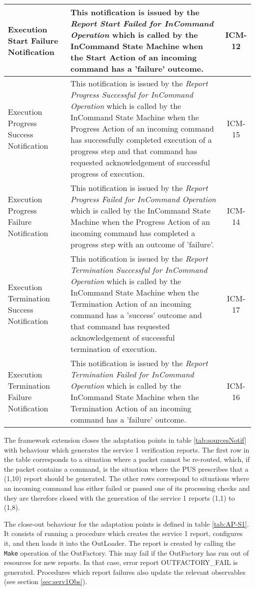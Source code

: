 \documentclass{pnp_article}
\begin{document}
\begin{longtable}{|>{\raggedright\arraybackslash}p{2.1cm}|>{\raggedright\arraybackslash}p{9.8cm}|c|}
\hline 
Execution Start Failure Notification &  This notification is issued by the \textit{Report Start Failed for InCommand Operation} which is called by the InCommand State Machine when the Start Action of an incoming command has a 'failure' outcome. & ICM-12 \\
\hline
Execution Progress Success Notification &  This notification is issued by the \textit{Report Progress Successful for InCommand Operation} which is called by the InCommand State Machine when the Progress Action of an incoming command has successfully completed execution of a progress step and that command has requested acknowledgement of successful progress of execution. & ICM-15 \\
\hline
Execution Progress Failure Notification &  This notification is issued by the \textit{Report Progress Failed for InCommand Operation} which is called by the InCommand State Machine when the Progress Action of an incoming command has completed a progress step with an outcome of 'failure'. & ICM-14 \\
\hline 
Execution Termination Success Notification &  This notification is issued by the  \textit{Report Termination Successful for InCommand Operation} which is called by the InCommand State Machine when the Termination Action of an incoming command has a 'success' outcome and that command has requested acknowledgement of successful termination of execution. & ICM-17 \\
\hline
Execution Termination Failure Notification &  This notification is issued by the \textit{Report Termination Failed for InCommand Operation} which is called by the InCommand State Machine when the Termination Action of an incoming command has a 'failure' outcome. & ICM-16 \\
\hline
\end{longtable} 

The framework extension closes the adaptation points in table \ref{tab:sourcesNotif} with behaviour which generates the service 1 verification reports. The first row in the table corresponds to a situation where a packet cannot be re-routed, which, if the packet contains a command, is the situation where the PUS prescribes that a (1,10) report should be generated. The other rows correspond to situations where an incoming command has either failed or passed one of its processing checks and they are therefore closed with the generation of the service 1 reports (1,1) to (1,8). 

The close-out behaviour for the adaptation points is defined in table \ref{tab:AP-S1}. It consists of running a procedure which creates the service 1 report, configures it, and then loads it into the OutLoader. The report is created by calling the \texttt{Make} operation of the OutFactory. This may fail if the OutFactory has run out of resources for new reports. In that case, error report OUTFACTORY\_FAIL is generated. Procedures which report failures also update the relevant observables (see section \ref{sec:serv1Obs}).
\end{document}

